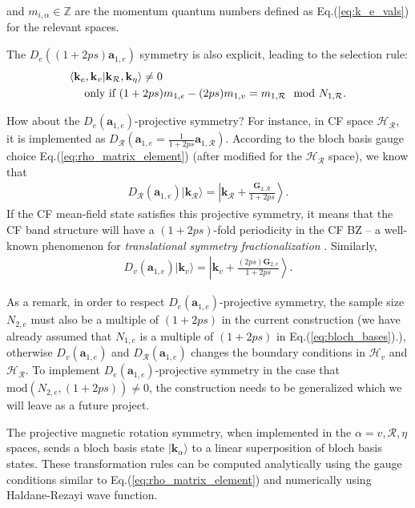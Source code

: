 and $m_{i,\alpha}\in \mathbb Z$ are the momentum quantum numbers defined as Eq.(\ref{eq:k_e_vals}) for the relevant spaces.

The $D_e((1+2ps)\mathbf a_{1,e})$ symmetry is also explicit, leading to the selection rule:
\begin{align}
     & \langle \mathbf k_e,\mathbf k_v|\mathbf k_{\mathcal R},\mathbf k_{\eta} \rangle \neq 0 \notag                      \\
     & \quad\text{ only if } (1+2ps)m_{1,e}-(2ps)m_{1,v}=m_{1,\mathcal R} \mod N_{1,\mathcal R}.\label{eq:CG_selection_1}
\end{align}

How about the $D_e(\mathbf a_{1,e})$-projective symmetry? For instance, in CF space $\mathcal H_{\mathcal R}$, it is implemented as $D_{\mathcal R}(\mathbf a_{1,e}=\frac{1}{1+2ps}\mathbf a_{1,\mathcal R})$. According to the bloch basis gauge choice Eq.(\ref{eq:rho_matrix_element}) (after modified for the $\mathcal H_{\mathcal R}$ space), we know that
\begin{align}\label{eq: translation fractionalization}
    D_{\mathcal R}(\mathbf a_{1,e})|\mathbf k_{\mathcal R}\rangle=\left|\mathbf k_{\mathcal R}+\frac{\mathbf G_{2,\mathcal R}}{1+2ps}\right\rangle.
\end{align}
If the CF mean-field state satisfies this projective symmetry, it means that the CF band structure will have a $(1+2ps)$-fold periodicity in the CF BZ -- a well-known phenomenon for \emph{translational symmetry fractionalization} \cite{wen2002quantum,chen2017symmetry,cheng2016translational}. Similarly,
\begin{align}
    D_{v}(\mathbf a_{1,e})|\mathbf k_v\rangle=\left|\mathbf k_v+\frac{(2ps)\mathbf G_{2,v}}{1+2ps}\right\rangle.
\end{align}

As a remark, in order to respect $D_e(\mathbf a_{1,e})$-projective symmetry, the sample size $N_{2,e}$ must also be a multiple of $(1+2ps)$ in the current construction (we have already assumed that $N_{1,e}$ is a multiple of $(1+2ps)$ in Eq.(\ref{eq:bloch_bases}).), otherwise $D_v(\mathbf a_{1,e})$ and $D_{\mathcal R}(\mathbf a_{1,e})$ changes the boundary conditions in $\mathcal H_v$ and $\mathcal H_{\mathcal R}$. To implement $D_e(\mathbf a_{1,e})$-projective symmetry in the case that $\text{mod}(N_{2,e},(1+2ps))\neq 0$, the construction needs to be generalized which we will leave as a future project.

The projective magnetic rotation symmetry, when implemented in the $\alpha=v,\mathcal R,\eta$ spaces, sends a bloch basis state $|\mathbf k_\alpha\rangle$ to a linear superposition of bloch basis states. These transformation rules can be computed analytically using the gauge conditions similar to Eq.(\ref{eq:rho_matrix_element}) and numerically using Haldane-Rezayi wave function.

